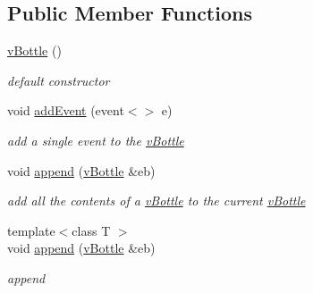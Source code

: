 \subsection*{Public Member Functions}
\begin{DoxyCompactItemize}
\item 
\mbox{\label{classev_1_1vBottle_afb002196d4fa9bd19af48be74327cb17}} 
\hyperlink{classev_1_1vBottle_afb002196d4fa9bd19af48be74327cb17}{v\+Bottle} ()
\begin{DoxyCompactList}\small\item\em default constructor \end{DoxyCompactList}\item 
\mbox{\label{classev_1_1vBottle_a5b17f0b46d9260ab255f38382b4b7268}} 
void \hyperlink{classev_1_1vBottle_a5b17f0b46d9260ab255f38382b4b7268}{add\+Event} (event$<$$>$ e)
\begin{DoxyCompactList}\small\item\em add a single event to the \hyperlink{classev_1_1vBottle}{v\+Bottle} \end{DoxyCompactList}\item 
\mbox{\label{classev_1_1vBottle_a0c78e6f9ef839038d71486f6a8a6294a}} 
void \hyperlink{classev_1_1vBottle_a0c78e6f9ef839038d71486f6a8a6294a}{append} (\hyperlink{classev_1_1vBottle}{v\+Bottle} \&eb)
\begin{DoxyCompactList}\small\item\em add all the contents of a \hyperlink{classev_1_1vBottle}{v\+Bottle} to the current \hyperlink{classev_1_1vBottle}{v\+Bottle} \end{DoxyCompactList}\item 
\mbox{\label{classev_1_1vBottle_a9ef66f613e1bbf196c515e7d8b0416df}} 
{\footnotesize template$<$class T $>$ }\\void \hyperlink{classev_1_1vBottle_a9ef66f613e1bbf196c515e7d8b0416df}{append} (\hyperlink{classev_1_1vBottle}{v\+Bottle} \&eb)
\begin{DoxyCompactList}\small\item\em append \end{DoxyCompactList}\item 
\mbox{\label{classev_1_1vBottle_a86302277c279a1b02d92f8e12afe6a2c}} 
$$
\end{DoxyCompactItemize}
